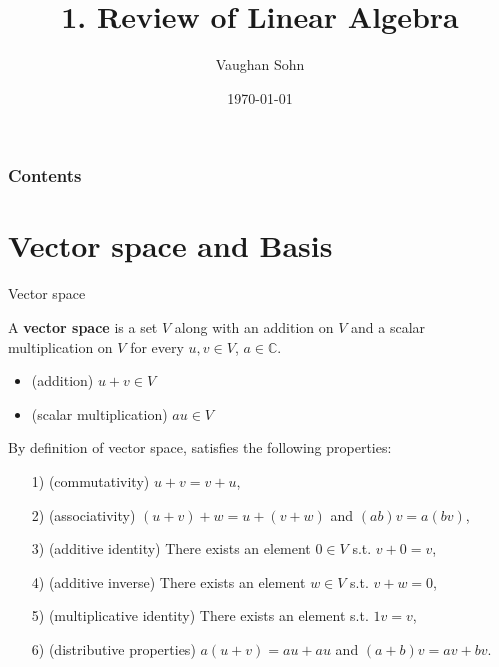 \documentclass[9pt]{beamer}
\title{1. Review of Linear Algebra}
\date{\today}
\author{Vaughan Sohn}
\begin{document}
    \maketitle
    
    \begin{frame}
        \frametitle{Contents}
        \tableofcontents
    \end{frame}

    \section{Vector space and Basis}

    \begin{frame}{Vector space}
        \begin{definition}
            A \textbf{vector space} is a set $V$ along with an addition on $V$ and a scalar multiplication on $V$ for every $u, v \in V$, $a \in \mathbb C$.
            \begin{itemize}
                \item (addition) $u+v \in V$
                \item (scalar multiplication) $ a u \in V$
            \end{itemize}
        \end{definition}
        \vspace{0.5cm}
        By definition of vector space, satisfies the following properties: \\ 
        \begin{itemize}
            \item[1)] (commutativity) $u+v = v+u$,
            \item[2)] (associativity) $(u+v)+w = u+ (v+w)$ and $(ab)v = a(bv)$,
            \item[3)] (additive identity) There exists an element $0 \in V$ s.t. $v+0=v$,
            \item[4)] (additive inverse) There exists an element $w \in V$ s.t. $v+w=0$,
            \item[5)] (multiplicative identity) There exists an element s.t. $1v = v$,
            \item[6)] (distributive properties) $a(u+v) = au+au$ and $(a+b)v = av+bv$. 
        \end{itemize}
    \end{frame}
\end{document}

